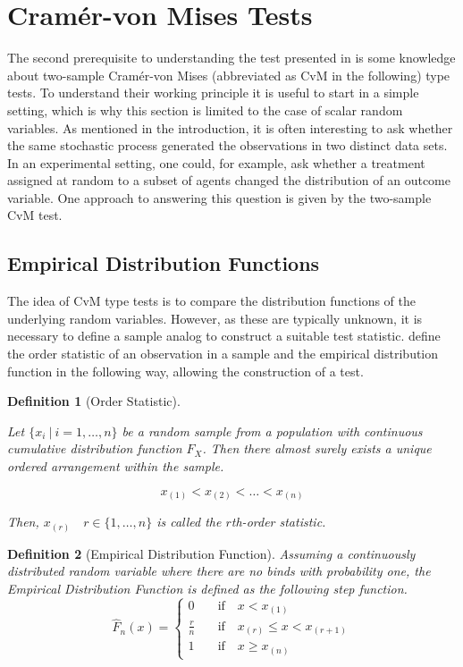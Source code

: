 \documentclass[12pt, a4paper]{article}
\theoremstyle{MAstyle} \newtheorem{assumption}{Assumption}[section]
\theoremstyle{MAstyle} \newtheorem{definition}{Definition}[section]
\theoremstyle{MAstyle} \newtheorem{theorem}{Theorem}[section]
\begin{document}
	\section{Cram\'{e}r-von Mises Tests}\label{CvM_Tests}
		The second prerequisite to understanding the test presented in \cite{bugni_permutation_2021} is some knowledge about two-sample Cram\'er-von Mises (abbreviated as CvM in the following) type tests. To understand their working principle it is useful to start in a simple setting, which is why this section is limited to the case of scalar random variables.
		As mentioned in the introduction, it is often interesting to ask whether the same stochastic process generated the observations in two distinct data sets. In an experimental setting, one could, for example, ask whether a treatment assigned at random to a subset of agents changed the distribution of an outcome variable. 
		One approach to answering this question is given by the two-sample CvM test. 

		\subsection{Empirical Distribution Functions}
			The idea of CvM type tests is to compare the distribution functions of the underlying random variables. However, as these are typically unknown, it is necessary to define a sample analog to construct a suitable test statistic.
			\cite{gibbons_nonparametric_2021} define the order statistic of an observation in a sample and the empirical distribution function in the following way, allowing the construction of a test.
			\begin{definition}[Order Statistic]\label{Order_Stat}
				
				Let $\{x_i \: \vert \: i = 1, \dots , n\}$ be a random sample from a population with continuous cumulative distribution function $F_X$. Then there almost surely exists a unique ordered arrangement within the sample. 
				
				$$x_{(1)} < x_{(2)} < \dots < x_{(n)}$$
				
				Then, $x_{(r)} \quad r \in \{1, \dots, n\}$ is called the $r$th-order statistic.	
			\end{definition}
		
			\begin{definition}[Empirical Distribution Function]
				Assuming a continuously distributed random variable where there are no binds with probability one, the Empirical Distribution Function is defined as the following step function.
				\begin{equation}
					\hat{F}_{n}(x) = \begin{cases}
						0 & \quad \text{if} \quad  x < x_{(1)} \\
						\frac{r}{n} & \quad \text{if} \quad  x_{(r)} \leq x < x_{(r + 1)} \\
						1 & \quad \text{if} \quad  x \geq x_{(n)} 
					\end{cases}
				\end{equation}
			\end{definition}
		
\end{document}
